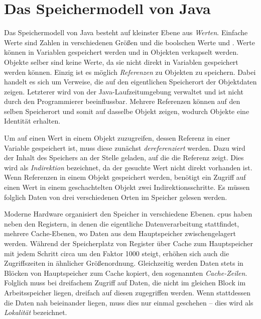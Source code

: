 \section{Das Speichermodell von Java}\label{sec:memory-model}

Das Speichermodell von Java besteht auf kleinster Ebene aus \emph{Werten}.
Einfache Werte sind Zahlen in verschiedenen Größen und die boolschen Werte  und .
Werte können in Variablen gespeichert werden und in Objekten verkapselt werden.
Objekte selber sind keine Werte, da sie nicht direkt in Variablen gespeichert werden können.
Einzig ist es möglich \emph{Referenzen} zu Objekten zu speichern.
Dabei handelt es sich um Verweise, die auf den eigentlichen Speicherort der Objektdaten zeigen.
Letzterer wird von der Java-Laufzeitumgebung verwaltet und ist nicht durch den Programmierer beeinflussbar.
Mehrere Referenzen können auf den selben Speicherort und somit auf dasselbe Objekt zeigen, wodurch Objekte eine Identität erhalten.

Um auf einen Wert in einem Objekt zuzugreifen, dessen Referenz in einer Variable gespeichert ist, muss diese zunächst \emph{dereferenziert} werden.
Dazu wird der Inhalt des Speichers an der Stelle geladen, auf die die Referenz zeigt.
Dies wird als \emph{Indirektion} bezeichnet, da der gesuchte Wert nicht direkt vorhanden ist.
Wenn Referenzen in einem Objekt gespeichert werden, benötigt ein Zugriff auf einen Wert in einem geschachtelten Objekt zwei Indirektionsschritte.
Es müssen folglich Daten von drei verschiedenen Orten im Speicher gelesen werden.

Moderne Hardware organisiert den Speicher in verschiedene Ebenen.
\acp{cpu} haben neben den Registern, in denen die eigentliche Datenverarbeitung stattfindet, mehrere Cache-Ebenen, wo Daten aus dem Hauptspeicher zwischengelagert werden.
Während der Speicherplatz von Register über Cache zum Hauptspeicher mit jedem Schritt circa um den Faktor 1000 steigt, erhöhen sich auch die Zugriffszeiten in ähnlicher Größenordnung.
Gleichzeitig werden Daten stets in Blöcken von Hauptspeicher zum Cache kopiert, den sogenannten \emph{Cache-Zeilen}.
Folglich muss bei dreifachem Zugriff auf Daten, die nicht im gleichen Block im Arbeitsspeicher liegen, dreifach auf diesen zugegriffen werden.
Wenn stattdessen die Daten nah beieinander liegen, muss dies nur einmal geschehen -- dies wird als \emph{Lokalität} bezeichnet.

